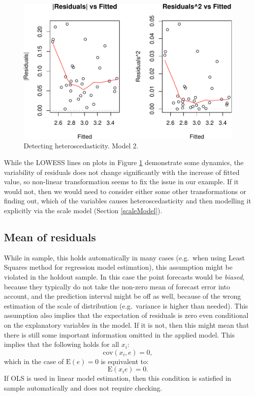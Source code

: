 \documentclass[
]{book}
\theoremstyle{definition}
\theoremstyle{definition}
\theoremstyle{definition}
\theoremstyle{definition}
\theoremstyle{remark}
\begin{document}
\begin{figure}
\centering
\includegraphics{Svetunkov---Statistics-for-Business-Analytics_files/figure-latex/diagnostics11-1.pdf}
\caption{\label{fig:diagnostics11}Detecting heteroscedasticity. Model 2.}
\end{figure}

While the LOWESS lines on plots in Figure \ref{fig:diagnostics11} demonstrate some dynamics, the variability of residuals does not change significantly with the increase of fitted value, so non-linear transformation seems to fix the issue in our example. If it would not, then we would need to consider either some other transformations or finding out, which of the variables causes heteroscedasticity and then modelling it explicitly via the scale model (Section \ref{scaleModel}).

\subsection{Mean of residuals}\label{assumptionsResidualsAreIIDMean}

While in sample, this holds automatically in many cases (e.g.~when using Least Squares method for regression model estimation), this assumption might be violated in the holdout sample. In this case the point forecasts would be \emph{biased}, because they typically do not take the non-zero mean of forecast error into account, and the prediction interval might be off as well, because of the wrong estimation of the scale of distribution (e.g.~variance is higher than needed). This assumption also implies that the expectation of residuals is zero even conditional on the explanatory variables in the model. If it is not, then this might mean that there is still some important information omitted in the applied model. This implies that the following holds for all \(x_i\):
\begin{equation*}
  \mathrm{cov}(x_i, e) = 0 ,
\end{equation*}
which in the case of \(\mathrm{E}(e)=0\) is equivalent to:
\begin{equation*}
  \mathrm{E}(x_i e) = 0 .
\end{equation*}
If OLS is used in linear model estimation, then this condition is satisfied in sample automatically and does not require checking.
\end{document}
